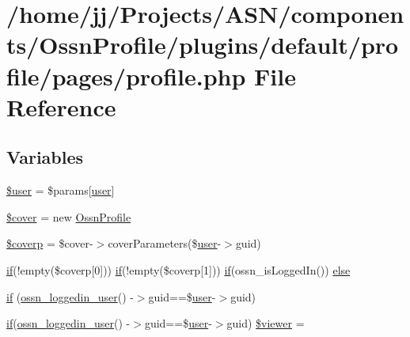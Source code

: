 \hypertarget{_ossn_profile_2plugins_2default_2profile_2pages_2profile_8php}{}\section{/home/jj/\+Projects/\+A\+S\+N/components/\+Ossn\+Profile/plugins/default/profile/pages/profile.php File Reference}
\label{_ossn_profile_2plugins_2default_2profile_2pages_2profile_8php}
\subsection*{Variables}
\begin{DoxyCompactItemize}
\item 
\hyperlink{_ossn_profile_2plugins_2default_2profile_2pages_2profile_8php_a598ca4e71b15a1313ec95f0df1027ca5}{\$user} = \$params\mbox{[}\textquotesingle{}\hyperlink{ossn_8config_8db_8example_8php_a802544b7ba9f79bbf24ef67773d53bed}{user}\textquotesingle{}\mbox{]}
\item 
\hyperlink{_ossn_profile_2plugins_2default_2profile_2pages_2profile_8php_a753dd5b85d0d36fb54a13adb92b005f3}{\$cover} = new \hyperlink{class_ossn_profile}{Ossn\+Profile}
\item 
\hyperlink{_ossn_profile_2plugins_2default_2profile_2pages_2profile_8php_ac6626e9aed3cadde1cdf83c93435b779}{\$coverp} = \$cover-\/$>$cover\+Parameters(\$\hyperlink{ossn_8config_8db_8example_8php_a802544b7ba9f79bbf24ef67773d53bed}{user}-\/$>$guid)
\item 
\hyperlink{jquery_8tokeninput_8js_ad8dd46a3cbc004569e34401e9e71771a}{if}(!empty(\$coverp\mbox{[}0\mbox{]})) \hyperlink{jquery_8tokeninput_8js_ad8dd46a3cbc004569e34401e9e71771a}{if}(!empty(\$coverp\mbox{[}1\mbox{]})) \hyperlink{jquery_8tokeninput_8js_ad8dd46a3cbc004569e34401e9e71771a}{if}(ossn\+\_\+is\+Logged\+In()) \hyperlink{_ossn_profile_2plugins_2default_2profile_2pages_2profile_8php_aef498ff3a1f67173465745ae95c6d26a}{else}
\item 
\hyperlink{_ossn_profile_2plugins_2default_2profile_2pages_2profile_8php_a75c57ef602ea74be196b1cff74c4eae1}{if} (\hyperlink{ossn_8lib_8users_8php_aa3c8068d0e6638b414d6a2f6c62565b8}{ossn\+\_\+loggedin\+\_\+user}() -\/$>$guid==\$\hyperlink{ossn_8config_8db_8example_8php_a802544b7ba9f79bbf24ef67773d53bed}{user}-\/$>$guid)
\item 
\hyperlink{jquery_8tokeninput_8js_ad8dd46a3cbc004569e34401e9e71771a}{if}(\hyperlink{ossn_8lib_8users_8php_aa3c8068d0e6638b414d6a2f6c62565b8}{ossn\+\_\+loggedin\+\_\+user}() -\/$>$guid==\$\hyperlink{ossn_8config_8db_8example_8php_a802544b7ba9f79bbf24ef67773d53bed}{user}-\/$>$guid) \hyperlink{_ossn_profile_2plugins_2default_2profile_2pages_2profile_8php_ab7afea8efe6cc87e7d4efca065083741}{\$viewer} = \textquotesingle{}\textquotesingle{}
\end{DoxyCompactItemize}


